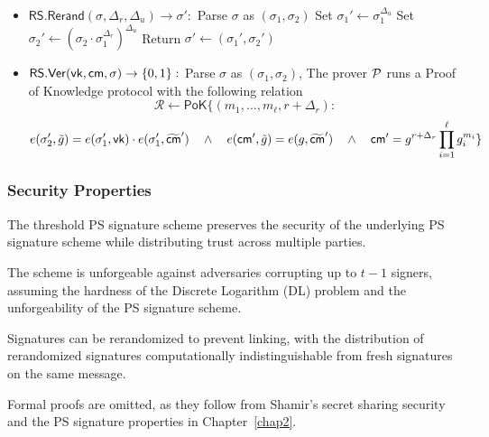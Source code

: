 \begin{itemize}
    \item $\mathsf{RS.Rerand}(\sigma, \Delta_r, \Delta_u) \to \sigma':$
        Parse $\sigma$ as $(\sigma_1, \sigma_2)$
        Set $\sigma_1' \gets \sigma_1^{\Delta_u}$
        Set $\sigma_2' \gets (\sigma_2 \cdot \sigma_1^{\Delta_r})^{\Delta_u}$
        Return $\sigma' \gets (\sigma_1', \sigma_2')$
    
    \item $\mathsf{RS.Ver}(\mathsf{vk}, \mathsf{cm}, \sigma) \to \{0,1\}:$
        Parse $\sigma$ as $(\sigma_1, \sigma_2)$, The prover $\mathcal{P}$ runs a Proof of Knowledge protocol with the following relation 
    \[
        \mathcal{R} \gets \mathsf{PoK}\{(m_1,\ldots,m_\ell, r + \Delta_r): 
    \]
    \[
         e(\sigma_2', \tilde{g}) = e(\sigma_1', \mathsf{vk})\cdot e(\sigma_1', \widetilde{\mathsf{cm}}') \quad \wedge \quad
        e(\mathsf{cm}', \tilde{g}) = e(g, \widetilde{\mathsf{cm}}') \quad \wedge \quad
        \mathsf{cm}' = g^{r + \Delta_r} \prod_{i=1}^\ell g_i^{m_i}
        \}
    \]

\end{itemize}

\subsubsection{Security Properties}

The threshold PS signature scheme preserves the security of the underlying PS signature scheme while distributing trust across multiple parties.

\begin{theorem}
The scheme is unforgeable against adversaries corrupting up to $t-1$ signers, assuming the hardness of the Discrete Logarithm (DL) problem and the unforgeability of the PS signature scheme.
\end{theorem}

\begin{theorem}[Rerandomizability]
Signatures can be rerandomized to prevent linking, with the distribution of rerandomized signatures computationally indistinguishable from fresh signatures on the same message.
\end{theorem}

Formal proofs are omitted, as they follow from Shamir’s secret sharing security and the PS signature properties in Chapter~\ref{chap2}.






